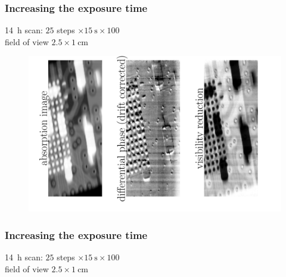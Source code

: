 \documentclass[first,firstsupp]{ETHclass}
\begin{document}
    \begin{frame}
        \frametitle{Increasing the exposure time}
        \SI{14}{\hour} scan: $25$ steps $\times \SI{15}{\second} \times
        100$\\
        field of view $2.5\times\SI{1}{\centi\metre}$
        \begin{figure}[h]
            \centering
            \includegraphics[height=.6\textheight]{chip-rot.pdf}
        \end{figure}
    \end{frame}
    \begin{frame}
        \frametitle{Increasing the exposure time}
        \SI{14}{\hour} scan: $25$ steps $\times \SI{15}{\second} \times
        100$\\
        field of view $2.5\times\SI{1}{\centi\metre}$
        \begin{figure}[h]
            \centering
        \end{figure}
    \end{frame}
\end{document}
